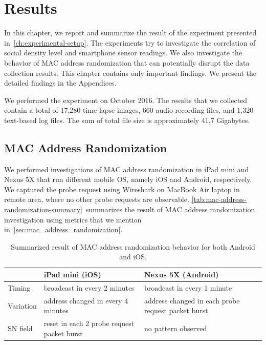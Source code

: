 \chapter{Results}
\label{ch:results} %
In this chapter, we report and summarize the result of the experiment presented in~\autoref{ch:experimental-setup}. The experiments try to investigate the correlation of social density level and smartphone sensor readings. We also investigate the behavior of \ac{MAC} address randomization that can potentially disrupt the data collection results. This chapter contains only important findings. We present the detailed findings in the Appendices.

We performed the experiment on October 2016. The results that we collected contain a total of 17,280 time-lapse images, 660 audio recording files, and 1,320 text-based log files. The sum of total file size is approximately 41,7 Gigabytes.

\section{MAC Address Randomization} %
\label{sec:mac-address-randomization}
We performed investigations of \ac{MAC} address randomization in iPad mini and Nexus 5X that run different mobile \ac{OS}, namely iOS and Android, respectively. We captured the probe request using Wireshark on MacBook Air laptop in remote area, where no other probe requests are observable. \autoref{tab:mac-address-randomization-summary}~summarizes the result of \ac{MAC} address randomization investigation using metrics that we mention in~\autoref{sec:mac_address_randomization}.

\begin{table}[ht]
\centering
\caption{Summarized result of \ac{MAC} address randomization behavior for both Android and iOS.}
\label{tab:mac-address-randomization-summary}
\begin{tabularx}{\textwidth}{lXX}
\toprule
                                        & iPad mini (iOS) & Nexus 5X (Android) \\
                                        \midrule
Timing    & broadcast in every 2 minutes & broadcast in every 1 minute \\ 
Variation & address changed in every 4 minutes & address changed in each probe request packet burst \\
\ac{SN} field & reset in each 2 probe request packet burst & no pattern observed \\ \bottomrule
\end{tabularx}
\end{table}

